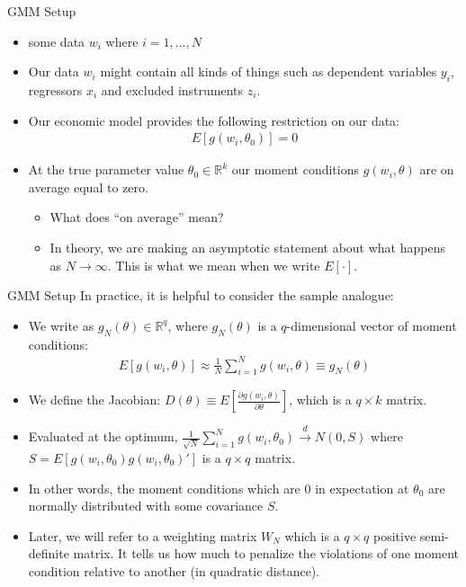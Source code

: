 \documentclass[aspectratio=169]{beamer}
\begin{document}
\begin{frame}{GMM Setup}
\begin{itemize}
\item some data $w_i$ where $i=1,\ldots,N$
\item Our data $w_i$ might contain all kinds of things such as dependent variables $y_i$, regressors $x_i$ and excluded instruments $z_i$.
\item Our economic model provides the following restriction on our data:
\begin{eqnarray*}
E[g(w_i, \theta_0) ] =0
\end{eqnarray*}
\item At the true parameter value $\theta_0\in \mathbb{R}^k$ our moment conditions $g(w_i,\theta)$ are on average equal to zero. 
\begin{itemize}
\item  What does ``on average'' mean? 
\item In theory, we are making an asymptotic statement about what happens as $N \rightarrow \infty$.  This is what we mean when we write $E[\cdot]$. 
\end{itemize}
\end{itemize}
\end{frame}

\begin{frame}{GMM Setup}
In practice, it is helpful to consider the sample analogue: 
\begin{itemize}
\item We write as $g_N(\theta) \in \mathbb{R}^q$, where $g_N(\theta)$ is a $q$-dimensional vector of moment conditions:
\begin{eqnarray*}
E[g(w_i, \theta )] \approx \frac{1}{N} \sum_{i=1}^N g(w_i, \theta)  \equiv g_N(\theta)
\end{eqnarray*}
\item We define the Jacobian: $D(\theta) \equiv E[\frac{\partial g(w_i,\theta)}{\partial \theta}]$, which is a $q \times k$ matrix.
\item Evaluated at the optimum, $\frac{1}{\sqrt{N}} \sum_{i=1}^N g(w_i,\theta_0) \overset{d}{\to} N(0,S)$ where $S = E[g(w_i,\theta_0) g(w_i,\theta_0)']$ is a $q \times q$ matrix.
\item In other words, the moment conditions which are $0$ in expectation at $\theta_0$ are normally distributed with some covariance $S$.
\item  Later, we will refer to a weighting matrix $W_N$ which is a $q \times q$ positive semi-definite matrix. It tells us how much to penalize the violations of one moment condition relative to another (in quadratic distance).
\end{itemize}
\end{frame}
\end{document}
